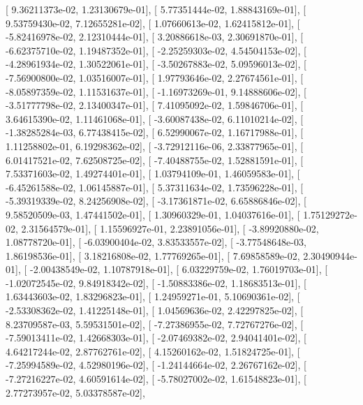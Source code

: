 \documentclass{article}
\begin{document}
       [  9.36211373e-02,   1.23130679e-01],
       [  5.77351444e-02,   1.88843169e-01],
       [  9.53759430e-02,   7.12655281e-02],
       [  1.07660613e-02,   1.62415812e-01],
       [ -5.82416978e-02,   2.12310444e-01],
       [  3.20886618e-03,   2.30691870e-01],
       [ -6.62375710e-02,   1.19487352e-01],
       [ -2.25259303e-02,   4.54504153e-02],
       [ -4.28961934e-02,   1.30522061e-01],
       [ -3.50267883e-02,   5.09596013e-02],
       [ -7.56900800e-02,   1.03516007e-01],
       [  1.97793646e-02,   2.27674561e-01],
       [ -8.05897359e-02,   1.11531637e-01],
       [ -1.16973269e-01,   9.14888606e-02],
       [ -3.51777798e-02,   2.13400347e-01],
       [  7.41095092e-02,   1.59846706e-01],
       [  3.64615390e-02,   1.11461068e-01],
       [ -3.60087438e-02,   6.11010214e-02],
       [ -1.38285284e-03,   6.77438415e-02],
       [  6.52990067e-02,   1.16717988e-01],
       [  1.11258802e-01,   6.19298362e-02],
       [ -3.72912116e-06,   2.33877965e-01],
       [  6.01417521e-02,   7.62508725e-02],
       [ -7.40488755e-02,   1.52881591e-01],
       [  7.53371603e-02,   1.49274401e-01],
       [  1.03794109e-01,   1.46059583e-01],
       [ -6.45261588e-02,   1.06145887e-01],
       [  5.37311634e-02,   1.73596228e-01],
       [ -5.39319339e-02,   8.24256908e-02],
       [ -3.17361871e-02,   6.65886846e-02],
       [  9.58520509e-03,   1.47441502e-01],
       [  1.30960329e-01,   1.04037616e-01],
       [  1.75129272e-02,   2.31564579e-01],
       [  1.15596927e-01,   2.23891056e-01],
       [ -3.89920880e-02,   1.08778720e-01],
       [ -6.03900404e-02,   3.83533557e-02],
       [ -3.77548648e-03,   1.86198536e-01],
       [  3.18216808e-02,   1.77769265e-01],
       [  7.69858589e-02,   2.30490944e-01],
       [ -2.00438549e-02,   1.10787918e-01],
       [  6.03229759e-02,   1.76019703e-01],
       [ -1.02072545e-02,   9.84918342e-02],
       [ -1.50883386e-02,   1.18683513e-01],
       [  1.63443603e-02,   1.83296823e-01],
       [  1.24959271e-01,   5.10690361e-02],
       [ -2.53308362e-02,   1.41225148e-01],
       [  1.04569636e-02,   2.42297825e-02],
       [  8.23709587e-03,   5.59531501e-02],
       [ -7.27386955e-02,   7.72767276e-02],
       [ -7.59013411e-02,   1.42668303e-01],
       [ -2.07469382e-02,   2.94041401e-02],
       [  4.64217244e-02,   2.87762761e-02],
       [  4.15260162e-02,   1.51824725e-01],
       [ -7.25994589e-02,   4.52980196e-02],
       [ -1.24144664e-02,   2.26767162e-02],
       [ -7.27216227e-02,   4.60591614e-02],
       [ -5.78027002e-02,   1.61548823e-01],
       [  2.77273957e-02,   5.03378587e-02],
\end{document}
